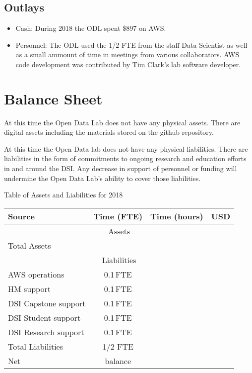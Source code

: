 \subsection{Outlays}
\begin{itemize}
\item Cash: During 2018 the ODL spent \$897 on AWS.
\item Personnel: The ODL used the 1/2 FTE from the staff Data Scientist as well as a small ammount of time in meetings from various collaborators. AWS code development was contributed by Tim Clark's lab software developer.
\end{itemize}

\section{Balance Sheet} %
At this time the Open Data Lab does not have any physical assets. There are digital assets including the materials stored on the github repository.

At this time the Open Data lab does not have any physical liabilities. There are liabilities in the form of commitments to ongoing research and education efforts in and around the DSI. Any decrease in support of personnel or funding will undermine the Open Data Lab's ability to cover those liabilities.

\begin{center}
Table of Assets and Liabilities for 2018

\begin{tabular}{lccr}
\hline
\hline
Source & Time (FTE) & Time (hours) & USD \\
\hline
\multicolumn{4}{c}{Assets} \\
\hline
\hline
Total Assets &  &  &  \\
\hline
\hline
\multicolumn{4}{c}{Liabilities} \\
\hline
AWS operations & 0.1\,FTE & &  \\
HM support & 0.1\,FTE &  & \\
DSI Capstone support & 0.1\,FTE & & \\
DSI Student support & 0.1\,FTE & & \\
DSI Research support & 0.1\,FTE & & \\
\hline
Total Liabilities & 1/2 FTE &  &  \\
\hline
\hline
Net & balance &  &  \\
\hline
\hline
\end{tabular}
\end{center}

